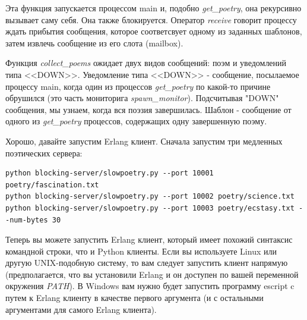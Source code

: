 Эта функция запускается процессом main и, подобно \textit{get\_poetry}, 
она рекурсивно вызывает саму себя. Она также блокируется. Оператор \textit{receive} 
говорит процессу ждать прибытия сообщения, которое соответсвует 
одному из заданных шаблонов, затем извлечь сообщение из его слота (mailbox).


Функция \textit{collect\_poems} ожидает двух видов 
сообщений: поэм и уведомлений типа <<DOWN>>. Уведомление типа <<DOWN>> - сообщение, 
посылаемое процессу main, когда один из процессов \textit{get\_poetry} 
по какой-то причине обрушился (это часть мониторига \textit{spawn\_monitor}). 
Подсчитывая "DOWN" сообщения, мы узнаем, когда вся поэзия завершилась. 
Шаблон - сообщение от одного из \textit{get\_poetry} процессов, 
содержащих одну завершенную поэму.

Хорошо, давайте  запустим Erlang клиент. Сначала запустим три медленных 
поэтических сервера:

\begin{scriptsize}\begin{verbatim}
python blocking-server/slowpoetry.py --port 10001 poetry/fascination.txt
python blocking-server/slowpoetry.py --port 10002 poetry/science.txt
python blocking-server/slowpoetry.py --port 10003 poetry/ecstasy.txt --num-bytes 30
\end{verbatim}\end{scriptsize}


Теперь вы можете запустить Erlang клиент, который 
имеет похожий синтаксис командной строки, что и 
Python клиенты. Если вы используете Linux или другую 
UNIX-подобную систему, то вам следует запустить 
клиент напрямую (предполагается, что вы установили 
Erlang и он доступен по вашей переменной окружения \textit{PATH}). 
В Windows вам нужно будет запустить программу escript c путем к 
Erlang клиенту в качестве первого аргумента (и с остальными 
аргументами для самого Erlang клиента).

